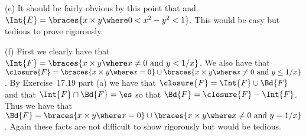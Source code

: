 {  (e) It should be fairly obvious by this point that
  and $\Int{E} = \braces{x \times y \where 0 < x^2 - y^2 < 1}$.
  This would be easy but tedious to prove rigorously.

  (f) First we clearly have that $\Int{F} = \braces{x \times y \where x \neq 0 \text{ and } y < 1/x}$.
  We also have that $\closure{F} = \braces{x \times y \where x = 0} \cup \braces{x \times y \where x \neq 0 \text{ and } y \leq 1/x}$.
  By Exercise~17.19 part (a) we have that $\closure{F} = \Int{F} \cup \Bd{F}$ and that $\Int{F} \cap \Bd{F} = \es$ so that $\Bd{F} = \closure{F} - \Int{F}$.
  Thus we have that $\Bd{F} = \braces{x \times y \where x = 0} \cup \braces{x \times y \where x \neq 0 \text{ and } y = 1/x}$.
  Again these facts are not difficult to show rigorously but would be tedious.
}

